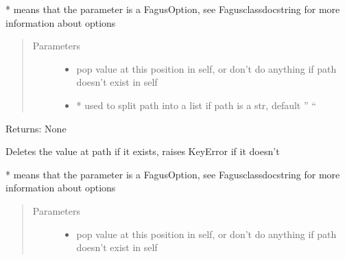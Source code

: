 \documentclass[a4paper,10pt,english]{sphinxmanual}
\begin{document}
\begin{fulllineitems}
\begin{fulllineitems}
\sphinxAtStartPar
* means that the parameter is a FagusOption, see Fagus\sphinxhyphen{}class\sphinxhyphen{}docstring for more information about options
\begin{quote}\begin{description}
\item[{Parameters}] \leavevmode\begin{itemize}
\item {}
\sphinxAtStartPar
{} \textendash{} pop value at this position in self, or don’t do anything if path doesn’t exist in self

\item {}
\sphinxAtStartPar
{} \textendash{} * used to split path into a list if path is a str, default ” “

\end{itemize}

\end{description}\end{quote}

\sphinxAtStartPar
Returns: None

\end{fulllineitems}


\begin{fulllineitems}
\label{\detokenize{fagus.fagus:fagus.fagus.Fagus.remove}}
\pysigstartsignatures
{}
\pysigstopsignatures
\sphinxAtStartPar
Deletes the value at path if it exists, raises KeyError if it doesn’t

\sphinxAtStartPar
* means that the parameter is a FagusOption, see Fagus\sphinxhyphen{}class\sphinxhyphen{}docstring for more information about options
\begin{quote}\begin{description}
\item[{Parameters}] \leavevmode\begin{itemize}
\item {}
\sphinxAtStartPar
{} \textendash{} pop value at this position in self, or don’t do anything if path doesn’t exist in self


\end{itemize}
\end{description}
\end{quote}
\end{fulllineitems}
\end{fulllineitems}
\end{document}
